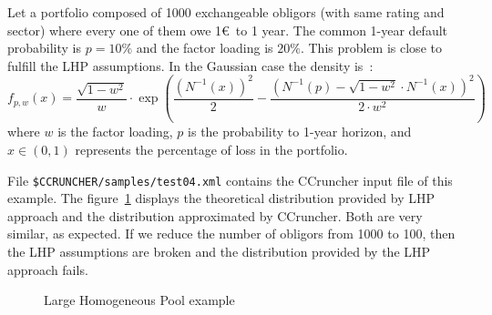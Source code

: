 \documentclass[11pt,fleqn]{book} %
\begin{document}
\begin{example}
	\label{ex:test04}
	Let a portfolio composed of 1000 exchangeable obligors (with same rating 
	and sector) where every one of them owe 1\euro\ to 1 year. The common 1-year
	default probability is $p=10\%$ and the factor loading is $20\%$. This 
	problem is close to fulfill the LHP assumptions. In the Gaussian case the 
	density is~\cite[chap. 2.5]{bluhm:2002}: 
	\begin{displaymath}
		f_{p,w}(x) = 
		\frac{\sqrt{1-w^2}}{w} \cdot \exp\left( 
			\frac{\left(N^{-1}(x)\right)^2}{2} -
			\frac{\left(N^{-1}(p) - \sqrt{1-w^2} \cdot N^{-1}(x)\right)^2}{2 \cdot w^2}
		\right)
	\end{displaymath}
	where $w$ is the factor loading, $p$ is the probability to 1-year horizon, 
	and $x \in (0,1)$ represents the percentage of loss in the portfolio. 

	File \texttt{\$CCRUNCHER/samples/test04.xml} contains the CCruncher input
	file of this example. The figure~\ref{fig:test04} displays the theoretical
	distribution provided by LHP approach and the distribution approximated by 
	CCruncher. Both are very similar, as expected. If we reduce the number of 
	obligors from 1000 to 100, then the LHP assumptions are broken and the 
	distribution provided by the LHP approach fails.
	\begin{figure}[!ht]
		\centering
		\caption{Large Homogeneous Pool example}
		\label{fig:test04} 
	\end{figure}
\end{example}

\end{document}
